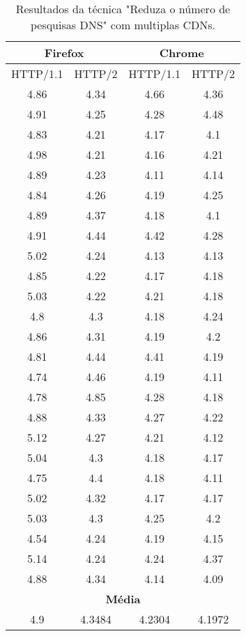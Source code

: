 \begin{table}[h]
	\centering
	\caption{Resultados da técnica "Reduza o número de pesquisas DNS" com multiplas CDNs.}
	\label{resultados-reduzaonumerodepesquisasdns-multiplas}
	\begin{tabular}{cccc}
		\hline
		\multicolumn{2}{c}{\textbf{Firefox}} & \multicolumn{2}{c}{\textbf{Chrome}} \\
		\hline
		HTTP/1.1 & HTTP/2 & HTTP/1.1 & HTTP/2 \\
		\hline
		4.86 & 4.34 & 4.66 & 4.36 \\
		4.91 & 4.25 & 4.28 & 4.48 \\
		4.83 & 4.21 & 4.17 & 4.1 \\
		4.98 & 4.21 & 4.16 & 4.21 \\
		4.89 & 4.23 & 4.11 & 4.14 \\
		4.84 & 4.26 & 4.19 & 4.25 \\
		4.89 & 4.37 & 4.18 & 4.1 \\
		4.91 & 4.44 & 4.42 & 4.28 \\
		5.02 & 4.24 & 4.13 & 4.13 \\
		4.85 & 4.22 & 4.17 & 4.18 \\
		5.03 & 4.22 & 4.21 & 4.18 \\
		4.8 & 4.3 & 4.18 & 4.24 \\
		4.86 & 4.31 & 4.19 & 4.2 \\
		4.81 & 4.44 & 4.41 & 4.19 \\ 
		4.74 & 4.46 & 4.19 & 4.11 \\
		4.78 & 4.85 & 4.28 & 4.18 \\
		4.88 & 4.33 & 4.27 & 4.22 \\ 
		5.12 & 4.27 & 4.21 & 4.12 \\
		5.04 & 4.3 & 4.18 & 4.17 \\
		4.75 & 4.4 & 4.18 & 4.11 \\
		5.02 & 4.32 & 4.17 & 4.17 \\
		5.03 & 4.3 & 4.25 & 4.2 \\
		4.54 & 4.24 & 4.19 & 4.15 \\
		5.14 & 4.24 & 4.24 & 4.37 \\
		4.88 & 4.34 & 4.14 & 4.09 \\
		\hline
		\multicolumn{4}{c}{\textbf{Média}} \\
		4.9 & 4.3484 & 4.2304 & 4.1972 \\
		\hline
	\end{tabular}
\end{table}